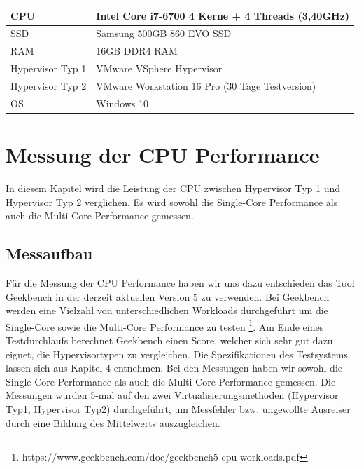 \documentclass[conference]{IEEEtran}
\begin{document}
\begin{table}[!h]
\begin{tabular}{|l|l|}
\hline
CPU              & Intel Core i7-6700 4 Kerne + 4 Threads (3,40GHz) \\ \hline
SSD              & Samsung 500GB 860 EVO SSD                        \\ \hline
RAM              & 16GB DDR4 RAM                                    \\ \hline
Hypervisor Typ 1 & VMware VSphere Hypervisor                        \\ \hline
Hypervisor Typ 2 & VMware Workstation 16 Pro (30 Tage Testversion)  \\ \hline
OS               & Windows 10                                       \\ \hline
\end{tabular}
\end{table}

\section{Messung der CPU Performance}
\label{Messung der CPU Performance}
In diesem Kapitel wird die Leistung der CPU zwischen Hypervisor Typ 1 und Hypervisor Typ 2 verglichen. Es wird sowohl die Single-Core Performance als auch die Multi-Core Performance gemessen.

\subsection{Messaufbau}
Für die Messung der CPU Performance haben wir uns dazu entschieden das Tool Geekbench in der derzeit aktuellen Version 5 zu verwenden. Bei Geekbench werden eine Vielzahl von unterschiedlichen Workloads durchgeführt um die Single-Core sowie die Multi-Core Performance zu testen \footnote{https://www.geekbench.com/doc/geekbench5-cpu-workloads.pdf}. Am Ende eines Testdurchlaufs berechnet Geekbench einen Score, welcher sich sehr gut dazu eignet, die Hypervisortypen zu vergleichen. Die Spezifikationen des Testsystems lassen sich aus Kapitel 4 entnehmen.
Bei den Messungen haben wir sowohl die Single-Core Performance als auch die Multi-Core Performance gemessen.  Die Messungen wurden 5-mal auf den zwei Virtualisierungsmethoden (Hypervisor Typ1, Hypervisor Typ2) durchgeführt, um Messfehler bzw. ungewollte Ausreiser durch eine Bildung des Mittelwerts auszugleichen.
\end{document}
